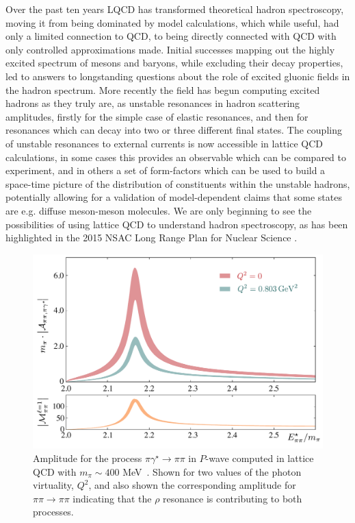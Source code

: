Over the past ten years LQCD has transformed theoretical hadron spectroscopy, moving it from being dominated by model calculations, which while useful, had only a limited connection to QCD, to being directly connected with QCD with only controlled approximations made. Initial successes mapping out the highly excited spectrum of mesons and baryons, while excluding their decay properties, led to answers to longstanding questions about the role of excited gluonic fields in the hadron spectrum. More recently the field has begun computing excited hadrons as they truly are, as unstable resonances in hadron scattering amplitudes, firstly for the simple case of elastic resonances, and then for resonances which can decay into two or three different final states. The coupling of unstable resonances to external currents is now accessible in lattice QCD calculations, in some cases this provides an observable which can be compared to experiment, and in others a set of form-factors which can be used to build a space-time picture of the distribution of constituents within the unstable hadrons, potentially allowing for a validation of model-dependent claims that some states are e.g. diffuse meson-meson molecules. We are only beginning to see the possibilities of using lattice QCD to understand hadron spectroscopy, as has been highlighted in the 2015 NSAC Long Range Plan for Nuclear Science \cite{Geesaman:2015fha}.


\begin{figure}
\includegraphics[width=0.95\columnwidth]{figures/rho_pi_gamma}
\caption{Amplitude for the process ${\pi \gamma^\star \to \pi\pi}$ in $P$-wave computed in lattice QCD with $m_\pi \sim 400$ MeV~\cite{Briceno:2016kkp,Briceno:2015dca}. Shown for two values of the photon virtuality, $Q^2$, and also shown the corresponding amplitude for $\pi\pi \to \pi \pi$ indicating that the $\rho$ resonance is contributing to both processes.  }
\label{rhopigamma}
\end{figure}

